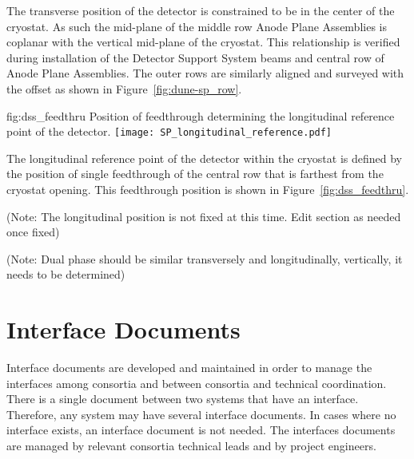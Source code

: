 The transverse position of the detector is constrained to be in the
center of the cryostat. As such the mid-plane of the middle row Anode
Plane Assemblies is coplanar with the vertical mid-plane of the
cryostat. This relationship is verified during installation of the
Detector Support System beams and central row of Anode Plane
Assemblies. The outer rows are similarly aligned and surveyed with the
offset as shown in Figure~\ref{fig:dune-sp_row}.
\begin{dunefigure}{fig:dss_feedthru}
  {Position of feedthrough determining the longitudinal reference point of the detector.}
  \texttt{[image: SP\_longitudinal\_reference.pdf]}
\end{dunefigure}


The longitudinal reference point of the detector within the cryostat
is defined by the position of single feedthrough of the central row
that is farthest from the cryostat opening. This feedthrough position
is shown in Figure~\ref{fig:dss_feedthru}.


(Note: The longitudinal position is not fixed at this time. Edit
section as needed once fixed)

(Note: Dual phase should be similar
transversely and longitudinally, vertically, it needs to be
determined)


\section{Interface Documents}
\label{sec:fdsp-coord-integ-interface}

Interface documents are developed and maintained in order to manage
the interfaces among consortia and between consortia and technical
coordination. There is a single document between two systems that have
an interface. Therefore, any system may have several interface
documents. In cases where no interface exists, an interface document
is not needed. The interfaces documents are managed by relevant
consortia technical leads and by  project engineers.

